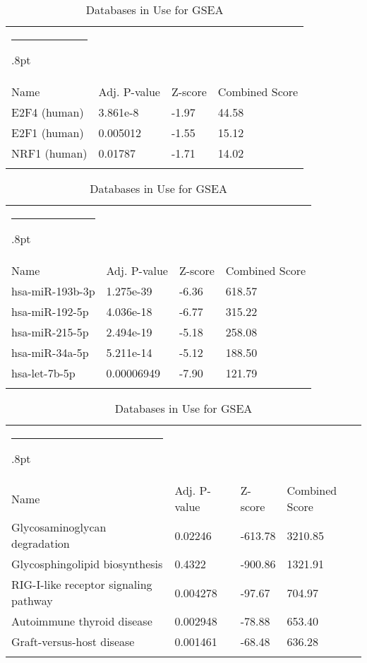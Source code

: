 \documentclass[3p,authoryear,preprint,12pt]{elsarticle}
\makeatletter
\def\hlinewd#1{%
  \noalign{\ifnum0=`}\fi\hrule \@height #1%
  \futurelet\reserved@a\@xhline}
\def\tbltoprule{\hlinewd{.8pt}\\[-12pt]}
\def\tblbottomrule{\noalign{\vspace*{6pt}}\hline\noalign{\vspace*{2pt}}}
\def\tblmidrule{\noalign{\vspace*{6pt}}\hline\noalign{\vspace*{2pt}}}
\makeatother
\begin{document}
\begin{table*}[!htbp]
	\caption{{Databases in Use for GSEA} }
	\label{tw-de478ae31cc6}
	\def\arraystretch{1}
	\ignorespaces 
	\centering 
	\begin{tabulary}{\linewidth}{p{\dimexpr.65\tabcolsep}p{\dimexpr.15\tabcolsep}p{\dimexpr.1\tabcolsep}p{\dimexpr.1\tabcolsep}}
		\tbltoprule Name & Adj. P-value & Z-score & Combined Score\\
		\tblmidrule
E2F4 (human) & 3.861e-8 & -1.97 & 44.58 \\
E2F1 (human) & 0.005012 & -1.55 & 15.12 \\
NRF1 (human) & 0.01787 & -1.71 & 14.02 \\
		\tblbottomrule
	\end{tabulary}\par 
\end{table*}
\begin{table*}[!htbp]
	\caption{{Databases in Use for GSEA} }
	\label{tw-de478ae31cc6}
	\def\arraystretch{1}
	\ignorespaces 
	\centering 
	\begin{tabulary}{\linewidth}{p{\dimexpr.65\tabcolsep}p{\dimexpr.15\tabcolsep}p{\dimexpr.1\tabcolsep}p{\dimexpr.1\tabcolsep}}
		\tbltoprule Name & Adj. P-value & Z-score & Combined Score\\
		\tblmidrule
hsa-miR-193b-3p & 1.275e-39 & -6.36 & 618.57 \\
hsa-miR-192-5p & 4.036e-18 & -6.77 & 315.22 \\
hsa-miR-215-5p & 2.494e-19 & -5.18 & 258.08 \\
hsa-miR-34a-5p & 5.211e-14 & -5.12 & 188.50 \\
hsa-let-7b-5p & 0.00006949 & -7.90 & 121.79 \\
		\tblbottomrule
	\end{tabulary}\par 
\end{table*}
\begin{table*}[!htbp]
	\caption{{Databases in Use for GSEA} }
	\label{tw-de478ae31cc6}
	\def\arraystretch{1}
	\ignorespaces 
	\centering 
	\begin{tabulary}{\linewidth}{p{\dimexpr.65\tabcolsep}p{\dimexpr.15\tabcolsep}p{\dimexpr.1\tabcolsep}p{\dimexpr.1\tabcolsep}}
		\tbltoprule Name & Adj. P-value & Z-score & Combined Score\\
		\tblmidrule
Glycosaminoglycan degradation & 0.02246 & -613.78 & 3210.85 \\
Glycosphingolipid biosynthesis & 0.4322 & -900.86 & 1321.91 \\
RIG-I-like receptor signaling pathway & 0.004278 & -97.67 & 704.97 \\
Autoimmune thyroid disease & 0.002948 & -78.88 & 653.40 \\
Graft-versus-host disease & 0.001461 & -68.48 & 636.28 \\
		\tblbottomrule
	\end{tabulary}\par 
\end{table*}
\end{document}
